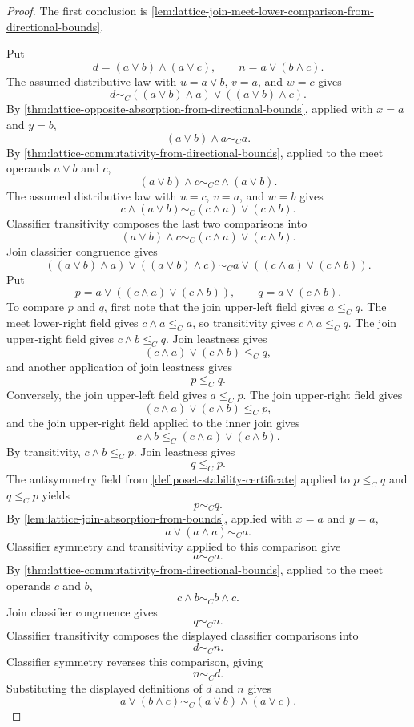 \begin{proof}
The first conclusion is \autoref{lem:lattice-join-meet-lower-comparison-from-directional-bounds}.

Put
$$
d=(a\vee b)\wedge(a\vee c),
\qquad
n=a\vee(b\wedge c).
$$
The assumed distributive law with $u=a\vee b$, $v=a$, and $w=c$ gives
$$
d\sim_C ((a\vee b)\wedge a)\vee((a\vee b)\wedge c).
$$
By \autoref{thm:lattice-opposite-absorption-from-directional-bounds}, applied with $x=a$ and $y=b$,
$$
(a\vee b)\wedge a\sim_C a.
$$
By \autoref{thm:lattice-commutativity-from-directional-bounds}, applied to the meet operands $a\vee b$ and $c$,
$$
(a\vee b)\wedge c\sim_C c\wedge(a\vee b).
$$
The assumed distributive law with $u=c$, $v=a$, and $w=b$ gives
$$
c\wedge(a\vee b)\sim_C (c\wedge a)\vee(c\wedge b).
$$
Classifier transitivity composes the last two comparisons into
$$
(a\vee b)\wedge c\sim_C (c\wedge a)\vee(c\wedge b).
$$
Join classifier congruence gives
$$
((a\vee b)\wedge a)\vee((a\vee b)\wedge c)
\sim_C
 a\vee((c\wedge a)\vee(c\wedge b)).
$$
Put
$$
p=a\vee((c\wedge a)\vee(c\wedge b)),
\qquad
q=a\vee(c\wedge b).
$$
To compare $p$ and $q$, first note that the join upper-left field gives $a\le_C q$. The meet lower-right field gives $c\wedge a\le_C a$, so transitivity gives $c\wedge a\le_C q$. The join upper-right field gives $c\wedge b\le_C q$. Join leastness gives
$$
(c\wedge a)\vee(c\wedge b)\le_C q,
$$
and another application of join leastness gives
$$
p\le_C q.
$$
Conversely, the join upper-left field gives $a\le_C p$. The join upper-right field gives
$$
(c\wedge a)\vee(c\wedge b)\le_C p,
$$
and the join upper-right field applied to the inner join gives
$$
c\wedge b\le_C (c\wedge a)\vee(c\wedge b).
$$
By transitivity, $c\wedge b\le_C p$. Join leastness gives
$$
q\le_C p.
$$
The antisymmetry field from \autoref{def:poset-stability-certificate} applied to $p\le_C q$ and $q\le_C p$ yields
$$
p\sim_C q.
$$
By \autoref{lem:lattice-join-absorption-from-bounds}, applied with $x=a$ and $y=a$,
$$
a\vee(a\wedge a)\sim_C a.
$$
Classifier symmetry and transitivity applied to this comparison give
$$
a\sim_C a.
$$
By \autoref{thm:lattice-commutativity-from-directional-bounds}, applied to the meet operands $c$ and $b$,
$$
c\wedge b\sim_C b\wedge c.
$$
Join classifier congruence gives
$$
q\sim_C n.
$$
Classifier transitivity composes the displayed classifier comparisons into
$$
d\sim_C n.
$$
Classifier symmetry reverses this comparison, giving
$$
n\sim_C d.
$$
Substituting the displayed definitions of $d$ and $n$ gives
$$
a\vee(b\wedge c)\sim_C (a\vee b)\wedge(a\vee c).
$$
\end{proof}

